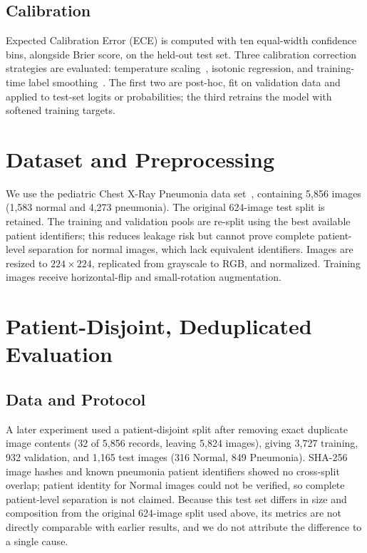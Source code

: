 \documentclass[11pt,a4paper]{article}
\begin{document}
\subsection{Calibration}
Expected Calibration Error (ECE) is computed with ten equal-width confidence
bins, alongside Brier score, on the held-out test set. Three calibration
correction strategies are evaluated: temperature
scaling~\cite{guo2017calibration}, isotonic regression, and training-time
label smoothing~\cite{muller2019labelsmoothing}. The first two are post-hoc,
fit on validation data and applied to test-set logits or probabilities; the
third retrains the model with softened training targets.

\section{Dataset and Preprocessing}
We use the pediatric Chest X-Ray Pneumonia data set~\cite{kermany2018identifying},
containing 5,856 images (1,583 normal and 4,273 pneumonia). The original
624-image test split is retained. The training and validation pools are
re-split using the best available patient identifiers; this reduces leakage
risk but cannot prove complete patient-level separation for normal images,
which lack equivalent identifiers. Images are resized to $224\times224$,
replicated from grayscale to RGB, and normalized. Training images receive
horizontal-flip and small-rotation augmentation.



\section{Patient-Disjoint, Deduplicated Evaluation}
\label{sec:dedup}

\subsection{Data and Protocol}
A later experiment used a patient-disjoint split after removing exact duplicate
image contents (32 of 5,856 records, leaving 5,824 images), giving 3,727
training, 932 validation, and 1,165 test images (316 Normal, 849 Pneumonia).
SHA-256 image hashes and known pneumonia patient identifiers showed no
cross-split overlap; patient identity for Normal images could not be verified,
so complete patient-level separation is not claimed. Because this test set
differs in size and composition from the original 624-image split used above,
its metrics are not directly comparable with earlier results, and we do not
attribute the difference to a single cause.
\end{document}
